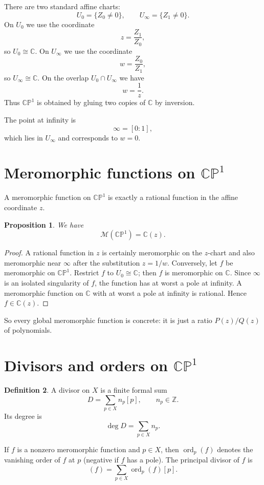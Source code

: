 \documentclass[11pt]{article}
\newcommand{\C}{\mathbb{C}}
\newcommand{\CP}{\mathbb{CP}}
\newcommand{\MM}{\mathcal{M}}
\newcommand{\ord}{\operatorname{ord}}
\newcommand{\degd}{\operatorname{deg}}
\newcommand{\CPone}{\CP^1}
\theoremstyle{definition}
\newtheorem{definition}{Definition}[section]
\theoremstyle{plain}
\newtheorem{proposition}[definition]{Proposition}
\begin{document}
There are two standard affine charts:
\[
U_0=\{Z_0\neq 0\},\qquad U_\infty=\{Z_1\neq 0\}.
\]
On $U_0$ we use the coordinate
\[
z=\frac{Z_1}{Z_0},
\]
so $U_0\cong \C$. On $U_\infty$ we use the coordinate
\[
w=\frac{Z_0}{Z_1},
\]
so $U_\infty\cong \C$. On the overlap $U_0\cap U_\infty$ we have
\[
w=\frac{1}{z}.
\]
Thus $\CPone$ is obtained by gluing two copies of $\C$ by inversion.

The point at infinity is
\[
\infty=[0:1],
\]
which lies in $U_\infty$ and corresponds to $w=0$.

\section{Meromorphic functions on \texorpdfstring{$\CPone$}{CP1}}
A meromorphic function on $\CPone$ is exactly a rational function in the affine coordinate $z$.

\begin{proposition}
We have
\[
\MM(\CPone)=\C(z).
\]
\end{proposition}

\begin{proof}
A rational function in $z$ is certainly meromorphic on the $z$-chart and also meromorphic near $\infty$ after the substitution $z=1/w$.
Conversely, let $f$ be meromorphic on $\CPone$. Restrict $f$ to $U_0\cong \C$; then $f$ is meromorphic on $\C$. Since $\infty$ is an isolated singularity of $f$, the function has at worst a pole at infinity. A meromorphic function on $\C$ with at worst a pole at infinity is rational. Hence $f\in \C(z)$.
\end{proof}

So every global meromorphic function is concrete: it is just a ratio $P(z)/Q(z)$ of polynomials.

\section{Divisors and orders on \texorpdfstring{$\CPone$}{CP1}}
\begin{definition}
A divisor on $X$ is a finite formal sum
\[
D=\sum_{p\in X} n_p[p],\qquad n_p\in \mathbb Z.
\]
Its degree is
\[
\degd D=\sum_{p\in X} n_p.
\]
\end{definition}

If $f$ is a nonzero meromorphic function and $p\in X$, then $\ord_p(f)$ denotes the vanishing order of $f$ at $p$ (negative if $f$ has a pole). The principal divisor of $f$ is
\[
(f)=\sum_{p\in X}\ord_p(f)[p].
\]
\end{document}
